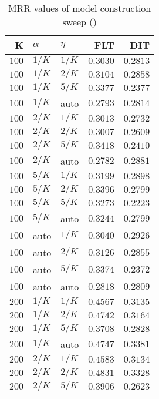 
\begin{table}
\begin{spacing}{1.2}
\centering
\caption{MRR values of \tika model construction sweep (\cone)}
\label{table:tika_model_sweep}
\vspace{0.2em}
\parbox{.45\linewidth}{\centering \begin{tabular}{rll|rr}
\toprule
    K &  $\alpha$ &    $\eta$ &           FLT &      DIT \\
\midrule
$100$ &  $1/K$ &  $1/K$ &      $0.3030$ & $0.2813$ \\
$100$ &  $1/K$ &  $2/K$ &      $0.3104$ & $0.2858$ \\
$100$ &  $1/K$ &  $5/K$ &      $0.3377$ & $0.2377$ \\
$100$ &  $1/K$ &   auto &      $0.2793$ & $0.2814$ \\
$100$ &  $2/K$ &  $1/K$ &      $0.3013$ & $0.2732$ \\
$100$ &  $2/K$ &  $2/K$ &      $0.3007$ & $0.2609$ \\
$100$ &  $2/K$ &  $5/K$ &      $0.3418$ & $0.2410$ \\
$100$ &  $2/K$ &   auto &      $0.2782$ & $0.2881$ \\
$100$ &  $5/K$ &  $1/K$ &      $0.3199$ & $0.2898$ \\
$100$ &  $5/K$ &  $2/K$ &      $0.3396$ & $0.2799$ \\
$100$ &  $5/K$ &  $5/K$ &      $0.3273$ & $0.2223$ \\
$100$ &  $5/K$ &   auto &      $0.3244$ & $0.2799$ \\
$100$ &   auto &  $1/K$ &      $0.3040$ & $0.2926$ \\
$100$ &   auto &  $2/K$ &      $0.3126$ & $0.2855$ \\
$100$ &   auto &  $5/K$ &      $0.3374$ & $0.2372$ \\
$100$ &   auto &   auto &      $0.2818$ & $0.2809$ \\
$200$ &  $1/K$ &  $1/K$ &      $0.4567$ & $0.3135$ \\
$200$ &  $1/K$ &  $2/K$ &      $0.4742$ & $0.3164$ \\
$200$ &  $1/K$ &  $5/K$ &      $0.3708$ & $0.2828$ \\
$200$ &  $1/K$ &   auto &      $0.4747$ & $0.3381$ \\
$200$ &  $2/K$ &  $1/K$ &      $0.4583$ & $0.3134$ \\
$200$ &  $2/K$ &  $2/K$ & $\bm{0.4831}$ & $0.3328$ \\
$200$ &  $2/K$ &  $5/K$ &      $0.3906$ & $0.2623$ \\

\end{tabular}}
\end{spacing}
\end{table}

